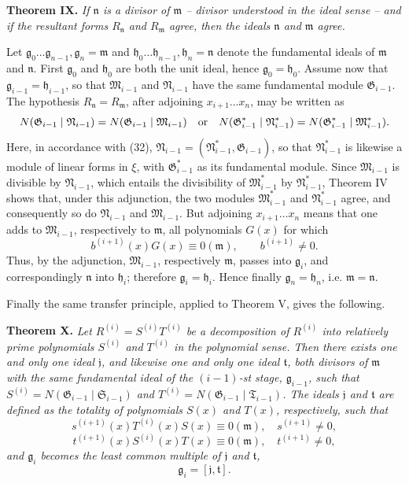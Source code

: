 \documentclass[11pt]{article}
\providecommand{\Gmod}{\mathfrak G}
\providecommand{\Smod}{\mathfrak S}
\providecommand{\mideal}{\mathfrak m}
\providecommand{\nideal}{\mathfrak n}
\providecommand{\gideal}{\mathfrak g}
\providecommand{\Gmod}{\mathfrak G}
\providecommand{\Mmod}{\mathfrak M}
\providecommand{\Nmod}{\mathfrak N}
\providecommand{\Smod}{\mathfrak S}
\providecommand{\mideal}{\mathfrak m}
\providecommand{\nideal}{\mathfrak n}
\providecommand{\gideal}{\mathfrak g}
\providecommand{\hideal}{\mathfrak h}
\providecommand{\jideal}{\mathfrak j}
\providecommand{\tideal}{\mathfrak t}
\begin{document}
\medskip
\noindent\textbf{Theorem IX.} \emph{If $\nideal$ is a divisor of $\mideal$ -- divisor understood in the ideal sense -- and if the resultant forms $R_\nideal$ and $R_\mideal$ agree, then the ideals $\nideal$ and $\mideal$ agree.}

Let $\gideal_0\ldots\gideal_{n-1},\gideal_n=\mideal$ and $\hideal_0\ldots\hideal_{n-1},\hideal_n=\nideal$ denote the fundamental ideals of $\mideal$ and $\nideal$. First $\gideal_0$ and $\hideal_0$ are both the unit ideal, hence $\gideal_0=\hideal_0$. Assume now that $\gideal_{i-1}=\hideal_{i-1}$, so that $\Mmod_{i-1}$ and $\Nmod_{i-1}$ have the same fundamental module $\Gmod_{i-1}$. The hypothesis $R_\nideal=R_\mideal$, after adjoining $x_{i+1}\ldots x_n$, may be written as
\[
 N(\Gmod_{i-1}\mid\Nmod_{i-1})=N(\Gmod_{i-1}\mid\Mmod_{i-1})
 \quad\hbox{or}\quad
 N(\Gmod^*_{i-1}\mid\Nmod^*_{i-1})=N(\Gmod^*_{i-1}\mid\Mmod^*_{i-1}).
\]
Here, in accordance with (32), $\Nmod_{i-1}=(\Nmod^*_{i-1},\Gmod_{i-1})$, so that $\Nmod^*_{i-1}$ is likewise a module of linear forms in $\xi$, with $\Gmod^*_{i-1}$ as its fundamental module. Since $\Mmod_{i-1}$ is divisible by $\Nmod_{i-1}$, which entails the divisibility of $\Mmod^*_{i-1}$ by $\Nmod^*_{i-1}$, Theorem IV shows that, under this adjunction, the two modules $\Mmod^*_{i-1}$ and $\Nmod^*_{i-1}$ agree, and consequently so do $\Nmod_{i-1}$ and $\Mmod_{i-1}$. But adjoining $x_{i+1}\ldots x_n$ means that one adds to $\Mmod_{i-1}$, respectively to $\mideal$, all polynomials $G(x)$ for which
\[
 b^{(i+1)}(x)G(x)\equiv0(\mideal),\qquad b^{(i+1)}\ne0.
\]
Thus, by the adjunction, $\Mmod_{i-1}$, respectively $\mideal$, passes into $\gideal_i$, and correspondingly $\nideal$ into $\hideal_i$; therefore $\gideal_i=\hideal_i$. Hence finally $\gideal_n=\hideal_n$, i.e. $\mideal=\nideal$.

Finally the same transfer principle, applied to Theorem V, gives the following.

\medskip
\noindent\textbf{Theorem X.} \emph{Let $R^{(i)}=S^{(i)}T^{(i)}$ be a decomposition of $R^{(i)}$ into relatively prime polynomials $S^{(i)}$ and $T^{(i)}$ in the polynomial sense. Then there exists one and only one ideal $\jideal$, and likewise one and only one ideal $\tideal$, both divisors of $\mideal$ with the same fundamental ideal of the $(i-1)$-st stage, $\gideal_{i-1}$, such that $S^{(i)}=N(\Gmod_{i-1}\mid\Smod_{i-1})$ and $T^{(i)}=N(\Gmod_{i-1}\mid\mathfrak T_{i-1})$. The ideals $\jideal$ and $\tideal$ are defined as the totality of polynomials $S(x)$ and $T(x)$, respectively, such that}
\[
 s^{(i+1)}(x)T^{(i)}(x)S(x)\equiv0(\mideal),\quad s^{(i+1)}\ne0,
\]
\[
 t^{(i+1)}(x)S^{(i)}(x)T(x)\equiv0(\mideal),\quad t^{(i+1)}\ne0,
\]
\emph{and $\gideal_i$ becomes the least common multiple of $\jideal$ and $\tideal$,}
\[
 \gideal_i=[\jideal,\tideal].
\]
\end{document}
